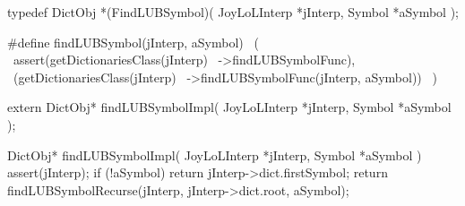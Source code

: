 \startCHeader
typedef DictObj *(FindLUBSymbol)(
  JoyLoLInterp *jInterp,
  Symbol       *aSymbol
);

#define findLUBSymbol(jInterp, aSymbol)       \
  (                                           \
    assert(getDictionariesClass(jInterp)      \
      ->findLUBSymbolFunc),                   \
    (getDictionariesClass(jInterp)            \
      ->findLUBSymbolFunc(jInterp, aSymbol))  \
  )
\stopCHeader

\setCHeaderStream{private}
\startCHeader
extern DictObj* findLUBSymbolImpl(
  JoyLoLInterp *jInterp,
  Symbol       *aSymbol
);
\stopCHeader
{}

\startCCode
DictObj* findLUBSymbolImpl(
  JoyLoLInterp *jInterp,
  Symbol       *aSymbol
) {
  assert(jInterp);
  if (!aSymbol) return jInterp->dict.firstSymbol;
  return findLUBSymbolRecurse(jInterp, jInterp->dict.root, aSymbol);
}
\stopCCode
